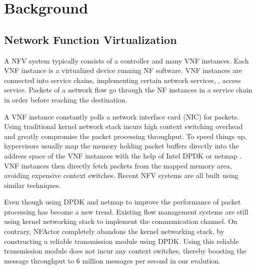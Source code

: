 \section{Background}
\label{sec:background}

\subsection{Network Function Virtualization}

A NFV system \cite{nfv-white-paper} typically consists of a controller and
many VNF instances. Each VNF instance is a virtualized device running NF software. VNF instances are connected into service chains, implementing certain network services, \eg, access service. Packets of a network flow go through the NF instances in a service chain in order before reaching the destination.

A VNF instance constantly polls a network interface card (NIC) for packets. Using traditional kernel network stack incurs high context switching overhead \cite{martins2014clickos} and greatly compromise the packet processing throughput. To speed things up, hypervisors usually map the memory holding packet buffers directly into the address space of the VNF instances with the help of Intel DPDK\cite{dpdk} or netmap \cite{netmap}. VNF instances then directly fetch packets from the mapped memory area, avoiding expensive context switches. Recent NFV systems \cite{palkar2015e2, Han:EECS-2015-155, sherry2015rollback, martins2014clickos, hwang2015netvm} are all built using similar techniques.


Even though using DPDK and netmap to improve the performance of packet processing has become a new trend. Existing flow management systems are still using kernel networking stack to implement the communication channel. On contrary, NFActor completely abandons the kernel networking stack, by constructing a reliable transmission module using DPDK. Using this reliable transmission module does not incur any context switches, thereby boosting the message throughput to 6 million messages per second in our evalution.

